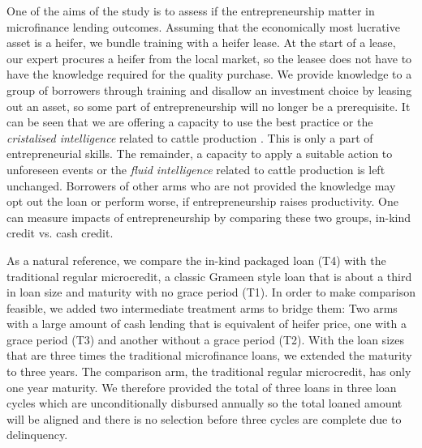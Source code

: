 	One of the aims of the study is to assess if the entrepreneurship matter in microfinance lending outcomes. Assuming that the economically most lucrative asset is a heifer, we bundle training with a heifer lease. At the start of a lease, our expert procures a heifer from the local market, so the leasee does not have to have the knowledge required for the quality purchase. We provide knowledge to a group of borrowers through training and disallow an investment choice by leasing out an asset, so some part of entrepreneurship will no longer be a prerequisite. It can be seen that we are offering a capacity to use the best practice or the \textit{cristalised intelligence} related to cattle production \citep{Cattell1963}. This is only a part of entrepreneurial skills. The remainder, a capacity to apply a suitable action to unforeseen events or the \textit{fluid intelligence} related to cattle production is left unchanged. Borrowers of other arms who are not provided the knowledge may opt out the loan or perform worse, if entrepreneurship raises productivity. One can measure impacts of entrepreneurship by comparing these two groups, in-kind credit vs. cash credit.
	
	As a natural reference, we compare the in-kind packaged loan (T4) with the traditional regular microcredit, a classic Grameen style loan that is about a third in loan size and maturity with no grace period (T1). In order to make comparison feasible, we added two intermediate treatment arms to bridge them: Two arms with a large amount of cash lending that is equivalent of heifer price, one with a grace period (T3) and another without a grace period (T2). With the loan sizes that are three times the traditional microfinance loans, we extended the maturity to three years. The comparison arm, the traditional regular microcredit, has only one year maturity. We therefore provided the total of three loans in three loan cycles which are unconditionally disbursed annually so the total loaned amount will be aligned and there is no selection before three cycles are complete due to delinquency. 
	
